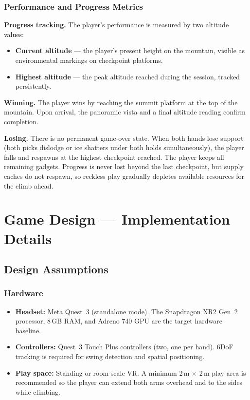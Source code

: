 \documentclass[12pt]{article}
\begin{document}
\subsubsection{Performance and Progress Metrics}

\textbf{Progress tracking.} The player's performance is measured by two altitude values:
\begin{itemize}[leftmargin=2em]
    \item \textbf{Current altitude} --- the player's present height on the mountain, visible as environmental markings on checkpoint platforms.
    \item \textbf{Highest altitude} --- the peak altitude reached during the session, tracked persistently.
\end{itemize}

\textbf{Winning.} The player wins by reaching the summit platform at the top of the mountain. Upon arrival, the panoramic vista and a final altitude reading confirm completion.

\textbf{Losing.} There is no permanent game-over state. When both hands lose support (both picks dislodge or ice shatters under both holds simultaneously), the player falls and respawns at the highest checkpoint reached. The player keeps all remaining gadgets. Progress is never lost beyond the last checkpoint, but supply caches do not respawn, so reckless play gradually depletes available resources for the climb ahead.

\newpage

\section{Game Design --- Implementation Details}

\subsection{Design Assumptions}

\subsubsection{Hardware}

\begin{itemize}[leftmargin=2em]
    \item \textbf{Headset:} Meta Quest~3 (standalone mode). The Snapdragon XR2 Gen~2 processor, 8\,GB RAM, and Adreno 740 GPU are the target hardware baseline.
    \item \textbf{Controllers:} Quest~3 Touch Plus controllers (two, one per hand). 6DoF tracking is required for swing detection and spatial positioning.
    \item \textbf{Play space:} Standing or room-scale VR. A minimum 2\,m $\times$ 2\,m play area is recommended so the player can extend both arms overhead and to the sides while climbing.
\end{itemize}
\end{document}
